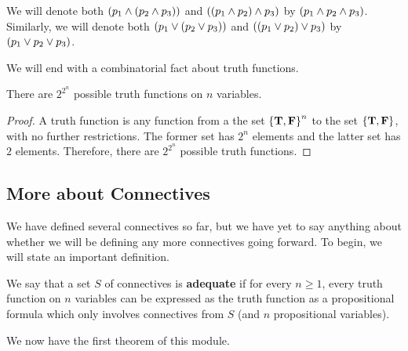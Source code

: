 \begin{boxconvention}
    We will denote both $\left( p_1 \land \left( p_2 \land p_3 \right) \right)$ and $\left( \left( p_1 \land p_2 \right) \land p_3 \right)$ by $\left( p_1 \land p_2 \land p_3 \right)$. Similarly, we will denote both $\left( p_1 \lor \left( p_2 \lor p_3 \right) \right)$ and $\left( \left( p_1 \lor p_2 \right) \lor p_3 \right)$ by $\left( p_1 \lor p_2 \lor p_3 \right)$.
\end{boxconvention}

We will end with a combinatorial fact about truth functions.

\begin{lemma}
    There are $2^{2^n}$ possible truth functions on $n$ variables.
\end{lemma}
\begin{proof}
    A truth function is any function from a the set $\left\{ \mathbf{T}, \mathbf{F} \right\}^n$ to the set $\left\{ \mathbf{T}, \mathbf{F} \right\}$, with no further restrictions. The former set has $2^n$ elements and the latter set has $2$ elements. Therefore, there are $2^{2^n}$ possible truth functions.
\end{proof}

\subsection{More about Connectives}

We have defined several connectives so far, but we have yet to say anything about whether we will be defining any more connectives going forward. To begin, we will state an important definition.

\begin{boxdefinition}[Adequacy]
    We say that a set $S$ of connectives is \textbf{adequate} if for every $n \geq 1$, every truth function on $n$ variables can be expressed as the truth function as a propositional formula which only involves connectives from $S$ (and $n$ propositional variables).
\end{boxdefinition}

We now have the first theorem of this module.


